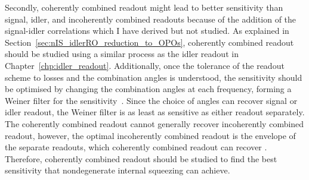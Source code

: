 Secondly, coherently combined readout might lead to better sensitivity than signal, idler, and incoherently combined readouts because of the addition of the signal-idler correlations which I have derived but not studied. As explained in Section~\ref{sec:nIS_idlerRO_reduction_to_OPOs}, coherently combined readout should be studied using a similar process as the idler readout in Chapter~\ref{chp:idler_readout}. Additionally, once the tolerance of the readout scheme to losses and the combination angles is understood, the sensitivity should be optimised by changing the combination angles at each frequency, forming a Weiner filter for the sensitivity~\cite{}. Since the choice of angles can recover signal or idler readout, the Weiner filter is as least as sensitive as either readout separately. The coherently combined readout cannot generally recover incoherently combined readout, however, the optimal incoherently combined readout is the envelope of the separate readouts, which coherently combined readout can recover . Therefore, coherently combined readout should be studied to find the best sensitivity that nondegenerate internal squeezing can achieve.

